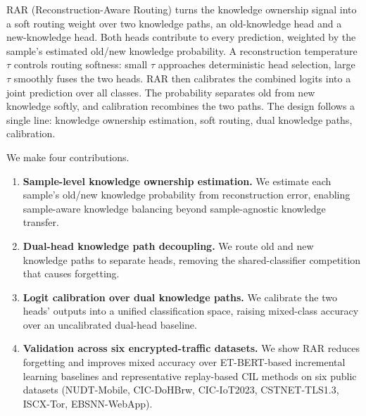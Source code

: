 RAR (Reconstruction-Aware Routing) turns the knowledge ownership signal into a soft routing weight over two knowledge paths, an old-knowledge head and a new-knowledge head.
Both heads contribute to every prediction, weighted by the sample's estimated old/new knowledge probability.
A reconstruction temperature $\tau$ controls routing softness: small $\tau$ approaches deterministic head selection, large $\tau$ smoothly fuses the two heads.
RAR then calibrates the combined logits into a joint prediction over all classes.
The probability separates old from new knowledge softly, and calibration recombines the two paths.
The design follows a single line: knowledge ownership estimation, soft routing, dual knowledge paths, calibration.

We make four contributions.
\begin{enumerate}
  \item \textbf{Sample-level knowledge ownership estimation.} We estimate each sample's old/new knowledge probability from reconstruction error, enabling sample-aware knowledge balancing beyond sample-agnostic knowledge transfer.
  \item \textbf{Dual-head knowledge path decoupling.} We route old and new knowledge paths to separate heads, removing the shared-classifier competition that causes forgetting.
  \item \textbf{Logit calibration over dual knowledge paths.} We calibrate the two heads' outputs into a unified classification space, raising mixed-class accuracy over an uncalibrated dual-head baseline.
  \item \textbf{Validation across six encrypted-traffic datasets.} We show RAR reduces forgetting and improves mixed accuracy over ET-BERT-based incremental learning baselines and representative replay-based CIL methods on six public datasets (NUDT-Mobile, CIC-DoHBrw, CIC-IoT2023, CSTNET-TLS1.3, ISCX-Tor, EBSNN-WebApp).
\end{enumerate}

